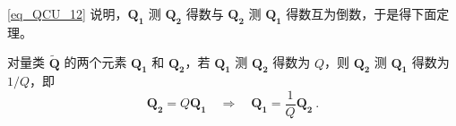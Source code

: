 \autoref{eq_QCU_12} 说明，$\boldsymbol{Q_1}$ 测 $\boldsymbol{Q_2}$ 得数与 $\boldsymbol{Q_2}$ 测 $\boldsymbol{Q_1}$ 得数互为倒数，于是得下面定理。
\begin{theorem}{}
对量类 $\tilde{\boldsymbol{Q}}$ 的两个元素 $\boldsymbol{Q_1}$ 和 $\boldsymbol{Q_2}$，若 $\boldsymbol{Q_1}$ 测 $\boldsymbol{Q_2}$ 得数为 $Q$，则 $\boldsymbol{Q_2}$ 测 $\boldsymbol{Q_1}$ 得数为 $1/Q$，即
\begin{equation}
\boldsymbol{Q_2}=Q\boldsymbol{Q_1}\quad\Rightarrow\quad\boldsymbol{Q_1}=\frac{1}{Q}\boldsymbol{Q_2}~.
\end{equation}
\end{theorem}
